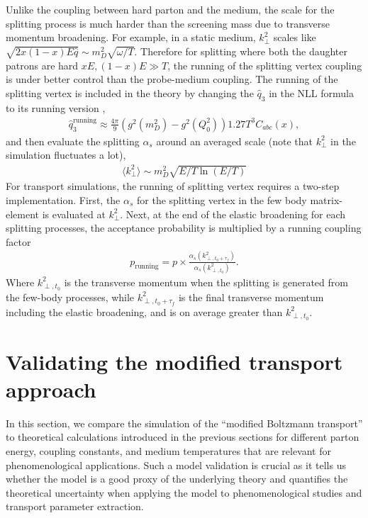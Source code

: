 Unlike the coupling between hard parton and the medium, the scale for the splitting process is much harder than the screening mass due to transverse momentum broadening. For example, in a static medium,  $k_\perp^2$ scales like $\sqrt{2x(1-x)E\hat{q}} \sim m_D^2 \sqrt{\omega/T}$.
Therefore for splitting where both the daughter patrons are hard $xE, (1-x)E \gg T$, the running of the splitting vertex coupling is under better control than the probe-medium coupling.
The running of the splitting vertex is included in the theory by changing the $\hat{q}_3$ in the NLL formula to its running version  \cite{Arnold:2008zu},
\begin{eqnarray}
\hat{q}_3^{\textrm{running}} \approx \frac{4\pi}{9}\left(g^2(m_D^2) - g^2(Q_0^2)\right) 1.27 T^3 C_{abc}(x),
\label{eq:q3running}
\end{eqnarray}
and then evaluate the splitting $\alpha_s$ around an averaged scale (note that $k_\perp^2$ in the simulation fluctuates a lot),
\begin{eqnarray}
\langle k_\perp^2\rangle \sim m_D^2 \sqrt{E/T\ln(E/T)}
\label{eq:runscale}
\end{eqnarray}  
For transport simulations, the running of splitting vertex requires a two-step implementation. 
First, the $\alpha_s$ for the splitting vertex in the few body matrix-element is evaluated at $k_\perp^2$.
Next, at the end of the elastic broadening for each splitting processes, the acceptance probability is multiplied by a running coupling factor
\begin{eqnarray}
p_{\textrm{running}} = p\times \frac{\alpha_s(k_{\perp,t_0+\tau_f}^2)}{\alpha_s(k_{\perp,t_0}^2)}.
\end{eqnarray}
Where $k_{\perp,t_0}^2$ is the transverse momentum when the splitting is generated from the few-body processes, while $k_{\perp,t_0+\tau_f}^2$ is the final transverse momentum including the elastic broadening, and is on average greater than $k_{\perp,t_0}^2$.

\section{Validating the modified transport approach}
\label{section:valiate_lido}
In this section, we compare the simulation of the ``modified Boltzmann transport'' to theoretical calculations introduced in the previous sections for different parton energy, coupling constants, and medium temperatures that are relevant for phenomenological applications.
Such a model validation is crucial as it tells us whether the model is a good proxy of the underlying theory and quantifies the theoretical uncertainty when applying the model to phenomenological studies and transport parameter extraction.

